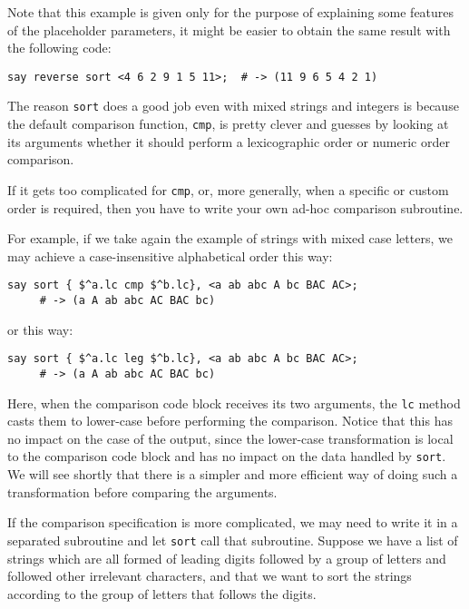 Note that this example is given only for the purpose of 
explaining some features of the placeholder parameters, 
it might be easier to obtain the same result with the 
following code:

\begin{verbatim}
say reverse sort <4 6 2 9 1 5 11>;  # -> (11 9 6 5 4 2 1)
\end{verbatim}

The reason {\tt sort} does a good job even with mixed 
strings and integers is because the default comparison 
function, {\tt cmp}, is pretty clever and guesses by 
looking at its arguments whether it should perform 
a lexicographic order or numeric order comparison.

If it gets too complicated for {\tt cmp}, or, more 
generally, when a specific or custom order is required, 
then you have to write your own ad-hoc comparison 
subroutine.

For example, if we take again the example of strings 
with mixed case letters, we may achieve a case-insensitive 
alphabetical order this way:

\begin{verbatim}
say sort { $^a.lc cmp $^b.lc}, <a ab abc A bc BAC AC>;
     # -> (a A ab abc AC BAC bc)
\end{verbatim}

or this way:
\begin{verbatim}
say sort { $^a.lc leg $^b.lc}, <a ab abc A bc BAC AC>;
     # -> (a A ab abc AC BAC bc)
\end{verbatim}

Here, when the comparison code block receives its two 
arguments, the {\tt lc} method casts them to lower-case 
before performing the comparison. Notice that this has 
no impact on the case of the output, since the lower-case 
transformation is local to the comparison code block and 
has no impact on the data handled by {\tt sort}. We will 
see shortly that there is a simpler and more efficient 
way of doing such a transformation before comparing the 
arguments.

If the comparison specification is more complicated, we 
may need to write it in a separated subroutine and let 
{\tt sort} call that subroutine. Suppose we have a list 
of strings which are all formed of leading digits 
followed by a group of letters and followed other 
irrelevant characters, and that we want to sort the 
strings according to the group of letters that follows 
the digits.


